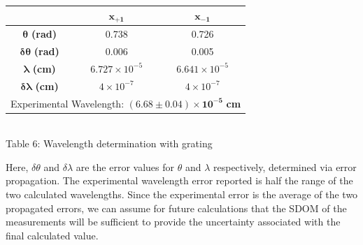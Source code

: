 \begin{center}
    
    \centering
    \begin{tabular}{|c|c|c|}
        \hline
         & $\bm{x_{+1}}$ & $\bm{x_{-1}}$ \\ \hline
        $\bm{\theta}$ \textbf{(rad)} & 0.738 & 0.726 \\ 
        $\bm{\delta\theta}$ \textbf{(rad)} & 0.006 & 0.005 \\
        $\bm{\lambda}$ \textbf{(cm)} & $6.727\times10^{-5}$ & $6.641\times10^{-5}$ \\ 
        $\bm{\delta\lambda}$\textbf{ (cm)} & $4\times10^{-7}$ & $4\times10^{-7}$\\\hline
        \multicolumn{3}{|c|}{Experimental Wavelength: $\bm{(6.68\pm0.04)\times10^{-5}}$ \textbf{cm}}\\ \hline
    \end{tabular} 
    \vspace{3mm}
    \\ Table 6: Wavelength determination with grating\\
\end{center}
Here, $\delta\theta$ and $\delta\lambda$ are the error values for $\theta$ and $\lambda$ respectively, determined via error propagation. 
The experimental wavelength error reported is half the range of the two calculated wavelengths.  
Since the experimental error is the average of the two propagated errors, we can assume for future calculations that the SDOM of the measurements will be sufficient to provide the uncertainty associated with the final calculated value.
